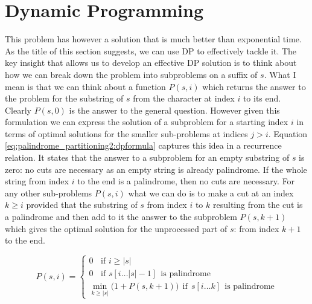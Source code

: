 \section{Dynamic Programming}
\label{sec:palindrome_partitioning2:DP}
This problem has however a solution that is much better than exponential time. As the title of this
section suggests, we can use DP to effectively tackle it. The key insight that allows us to develop
an effective DP solution is to think about how we can break down the problem into subproblems on a
suffix of $s$. What I mean is that we can think about a function $P(s, i)$ which returns the answer
to the problem for the substring of $s$ from the character at index $i$ to its end. Clearly $P(s,0)$
is the answer to the general question. However given this formulation  we can express the solution
of a subproblem for a starting index $i$ in terms of optimal solutions for the smaller sub-problems
at indices $j>i$. Equation \ref{eq:palindrome_partitioning2:dpformula} captures this idea in a
recurrence relation. It states that the answer to a subproblem for an empty substring of $s$ is
zero: no cuts are necessary as an empty string is already palindrome. If the whole string from index
$i$ to the end is a palindrome, then no cuts are necessary. For any other sub-problems $P(s,i)$ what
we can do is to make a cut at an index $k\geq i$ provided that  the  substring of $s$ from index $i$
to $k$ resulting from the cut is a palindrome and then add to it the answer to the subproblem
$P(s,k+1)$ which gives the optimal solution for the unprocessed part of $s$: from index $k+1$ to the
end.

\begin{equation}
	P(s, i) = \begin{cases}
		0 \; \; \text{ if } i \geq |s|  \\
		0 \; \; \text{ if } s[i\ldots |s|-1]  \:\: \text{is palindrome}  \\
		\min_{k\geq |s|} \big( 1 + P(s,k+1) \big) \: \: \text{if} \: \: s[i\ldots k]  \:\: \text{is palindrome}
	 \end{cases}
	\label{eq:palindrome_partitioning2:dpformula}
\end{equation}

